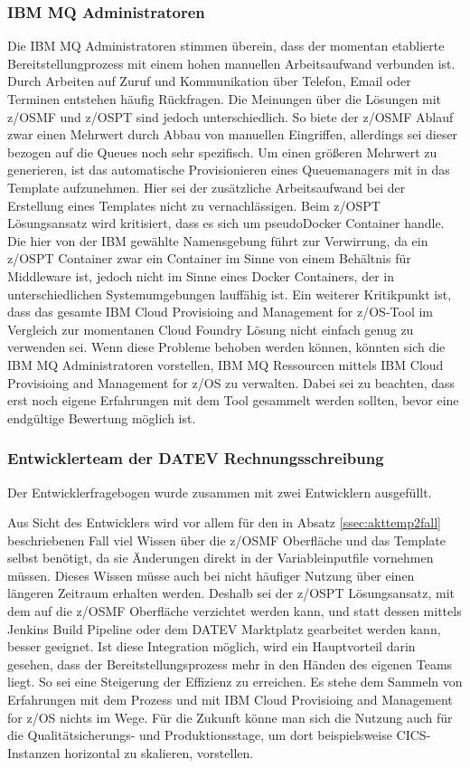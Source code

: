 \subsubsection{IBM MQ Administratoren}
Die IBM MQ Administratoren stimmen überein, dass der momentan etablierte Bereitstellungprozess mit einem hohen manuellen Arbeitsaufwand verbunden ist.
Durch Arbeiten auf Zuruf und Kommunikation über Telefon, Email oder Terminen entstehen häufig Rückfragen.
Die Meinungen über die Lösungen mit z/OSMF und z/OSPT sind jedoch unterschiedlich.
So biete der z/OSMF Ablauf zwar einen Mehrwert durch Abbau von manuellen Eingriffen, allerdings sei dieser bezogen auf die Queues noch sehr spezifisch.
Um einen größeren Mehrwert zu generieren, ist das automatische Provisionieren eines Queuemanagers mit in das Template aufzunehmen.
Hier sei der zusätzliche Arbeitsaufwand bei der Erstellung eines Templates nicht zu vernachlässigen.
Beim z/OSPT Lösungsansatz wird kritisiert, dass es sich  um \glqq pseudo\grqq Docker Container handle.
Die hier von der IBM gewählte Namensgebung führt zur Verwirrung, da ein z/OSPT Container zwar ein Container im Sinne von einem Behältnis für Middleware ist, jedoch nicht im Sinne eines Docker Containers, der in unterschiedlichen Systemumgebungen lauffähig ist.
Ein weiterer Kritikpunkt ist, dass das gesamte \glqq IBM Cloud Provisioing and Management for z/OS\grqq-Tool im Vergleich zur momentanen Cloud Foundry Lösung nicht einfach genug zu verwenden sei. 
Wenn diese Probleme behoben werden können, könnten sich die IBM MQ Administratoren vorstellen, IBM MQ Ressourcen mittels \glqq IBM Cloud Provisioing and Management for z/OS\grqq{} zu verwalten.
Dabei sei zu beachten, dass erst noch eigene Erfahrungen mit dem Tool gesammelt werden sollten, bevor eine endgültige Bewertung möglich ist.

\subsubsection{Entwicklerteam der DATEV Rechnungsschreibung}
Der Entwicklerfragebogen wurde zusammen mit zwei Entwicklern ausgefüllt.

Aus Sicht des Entwicklers wird vor allem für den in Absatz \ref{ssec:akttemp2fall} beschriebenen Fall viel Wissen über die z/OSMF Oberfläche und das Template selbst benötigt, da sie Änderungen direkt in der Variableinputfile vornehmen müssen.
Dieses Wissen müsse auch bei nicht häufiger Nutzung über einen längeren Zeitraum erhalten werden.
Deshalb sei der z/OSPT Lösungsansatz, mit dem auf die z/OSMF Oberfläche verzichtet werden kann, und statt dessen mittels Jenkins Build Pipeline oder dem DATEV \glqq Marktplatz\grqq{} gearbeitet werden kann, besser geeignet.
Ist diese Integration möglich, wird ein Hauptvorteil darin gesehen, dass der Bereitstellungsprozess mehr in den Händen des eigenen Teams liegt.
So sei eine Steigerung der Effizienz zu erreichen.
Es stehe dem Sammeln von Erfahrungen mit dem Prozess und mit \glqq IBM Cloud Provisioing and Management for z/OS\grqq{} nichts im Wege.
Für die Zukunft könne man sich die Nutzung auch für die Qualitätsicherungs- und Produktionsstage, um dort beispielsweise CICS-Instanzen horizontal zu skalieren, vorstellen.

